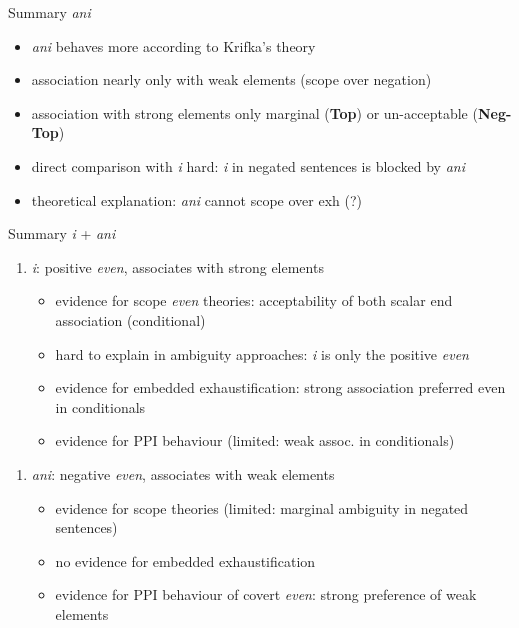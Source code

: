 \documentclass[ignorenonframetext,]{beamer}
\providecommand{\tightlist}{%
  \setlength{\itemsep}{0pt}\setlength{\parskip}{0pt}}
\newcommand{\cond}[1]{\textbf{#1}}
\begin{document}
\begin{frame}{Summary \emph{ani}}

\begin{itemize}
\tightlist
\item
  \emph{ani} behaves more according to Krifka's theory
\item
  association nearly only with weak elements (scope over negation)
\item
  association with strong elements only marginal (\cond{Top}) or
  un-acceptable (\cond{Neg-Top})
\item
  direct comparison with \emph{i} hard: \emph{i} in negated sentences is
  blocked by \emph{ani}
\item
  theoretical explanation: \emph{ani} cannot scope over exh (?)
\end{itemize}

\end{frame}

\begin{frame}{Summary \emph{i} + \emph{ani}}

\begin{enumerate}
\def\labelenumi{\arabic{enumi})}
\tightlist
\item
  \emph{i}: positive \emph{even}, associates with strong elements

  \begin{itemize}
  \tightlist
  \item
    evidence for scope \emph{even} theories: acceptability of both
    scalar end association (conditional)
  \item
    hard to explain in ambiguity approaches: \emph{i} is only the
    positive \emph{even}
  \item
    evidence for embedded exhaustification: strong association preferred
    even in conditionals
  \item
    evidence for PPI behaviour (limited: weak assoc. in conditionals)
  \end{itemize}
\end{enumerate}

\end{frame}

\begin{frame}

\begin{enumerate}
\def\labelenumi{\arabic{enumi})}
\setcounter{enumi}{1}
\tightlist
\item
  \emph{ani}: negative \emph{even}, associates with weak elements

  \begin{itemize}
  \tightlist
  \item
    evidence for scope theories (limited: marginal ambiguity in negated
    sentences)
  \item
    no evidence for embedded exhaustification
  \item
    evidence for PPI behaviour of covert \emph{even}: strong preference
    of weak elements
  \end{itemize}
\end{enumerate}

\end{frame}
\end{document}
